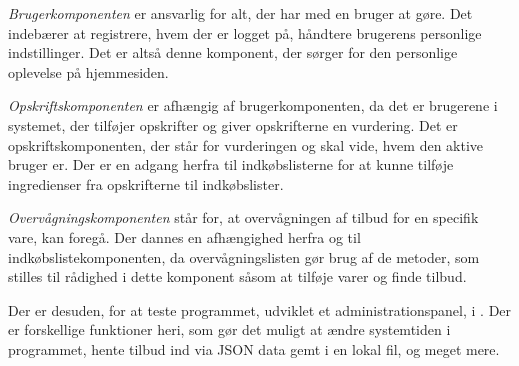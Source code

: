 \textit{Brugerkomponenten} er ansvarlig for alt, der har med en bruger at gøre. 
Det indebærer at registrere, hvem der er logget på, håndtere brugerens personlige indstillinger. 
Det er altså denne komponent, der sørger for den personlige oplevelse på hjemmesiden.

\textit{Opskriftskomponenten} er afhængig af brugerkomponenten, da det er brugerene i systemet, der tilføjer opskrifter og giver opskrifterne en vurdering.
Det er opskriftskomponenten, der står for vurderingen og skal vide, hvem den aktive bruger er.
Der er en adgang herfra til indkøbslisterne for at kunne tilføje ingredienser fra opskrifterne til indkøbslister.

\textit{Overvågningskomponenten} står for, at overvågningen af tilbud for en specifik vare, kan foregå.
Der dannes en afhængighed herfra og til indkøbslistekomponenten, da overvågningslisten gør brug af de metoder, som stilles til rådighed i dette komponent såsom at tilføje varer og finde tilbud.

Der er desuden, for at teste programmet, udviklet et administrationspanel, i . 
Der er forskellige funktioner heri, som gør det muligt at ændre systemtiden i programmet, hente tilbud ind via JSON data gemt i en lokal fil, og meget mere.


